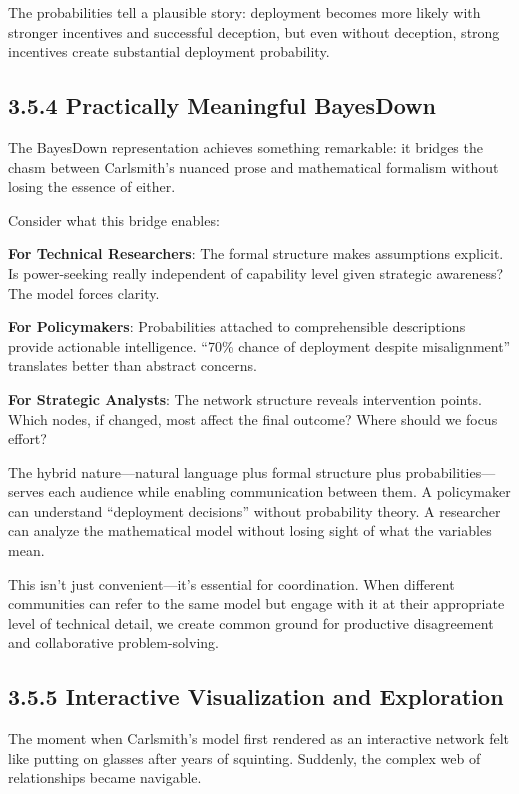 \documentclass[
  11pt,
  letterpaper,
]{book}
\begin{document}
The probabilities tell a plausible story: deployment becomes more likely
with stronger incentives and successful deception, but even without
deception, strong incentives create substantial deployment probability.

\subsection{3.5.4 Practically Meaningful
BayesDown}\label{sec-practically-meaningful}

The BayesDown representation achieves something remarkable: it bridges
the chasm between Carlsmith's nuanced prose and mathematical formalism
without losing the essence of either.

Consider what this bridge enables:

\textbf{For Technical Researchers}: The formal structure makes
assumptions explicit. Is power-seeking really independent of capability
level given strategic awareness? The model forces clarity.

\textbf{For Policymakers}: Probabilities attached to comprehensible
descriptions provide actionable intelligence. ``70\% chance of
deployment despite misalignment'' translates better than abstract
concerns.

\textbf{For Strategic Analysts}: The network structure reveals
intervention points. Which nodes, if changed, most affect the final
outcome? Where should we focus effort?

The hybrid nature---natural language plus formal structure plus
probabilities---serves each audience while enabling communication
between them. A policymaker can understand ``deployment decisions''
without probability theory. A researcher can analyze the mathematical
model without losing sight of what the variables mean.

This isn't just convenient---it's essential for coordination. When
different communities can refer to the same model but engage with it at
their appropriate level of technical detail, we create common ground for
productive disagreement and collaborative problem-solving.

\subsection{3.5.5 Interactive Visualization and
Exploration}\label{sec-interactive-visualization}

The moment when Carlsmith's model first rendered as an interactive
network felt like putting on glasses after years of squinting. Suddenly,
the complex web of relationships became navigable.
\end{document}
